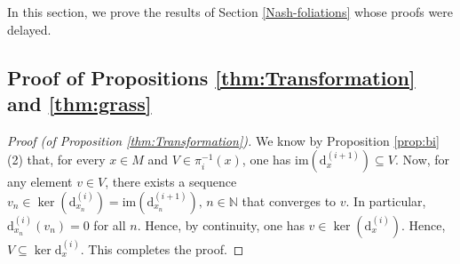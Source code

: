 \documentclass[10pt]{article}
\theoremstyle{plain}
\theoremstyle{definition}
\theoremstyle{remark}
\newcommand{\dd}{\mathrm{d}}
\begin{document}
In this section, we prove the results of Section \ref{Nash-foliations} whose proofs were delayed.



\subsection{Proof of Propositions  \ref{thm:Transformation} and \ref{thm:grass}}

\begin{proof}[Proof (of Proposition \ref{thm:Transformation})]
We know by Proposition \ref{prop:bi}(2) that, for every $x\in M$ and $V\in \pi_i^{-1}(x)$, one has $\mathrm{im}(\dd^{(i+1)}_{x})\subseteq V$. Now,  for any element $v\in V$, there exists a sequence $v_n\in \ker(\dd^{(i)}_{x_n})=\mathrm{im}(\dd^{(i+1)}_{x_n}),\, n\in \mathbb{N}$ that converges to $v$. In particular, $\dd^{(i)}_{x_n}(v_n)=0$ for all $n$. Hence, by continuity, one has $v\in \ker(\dd^{(i)}_{x})$. Hence, $V\subseteq \ker \dd^{(i)}_x$. This completes the proof.

\end{proof}
\end{document}
